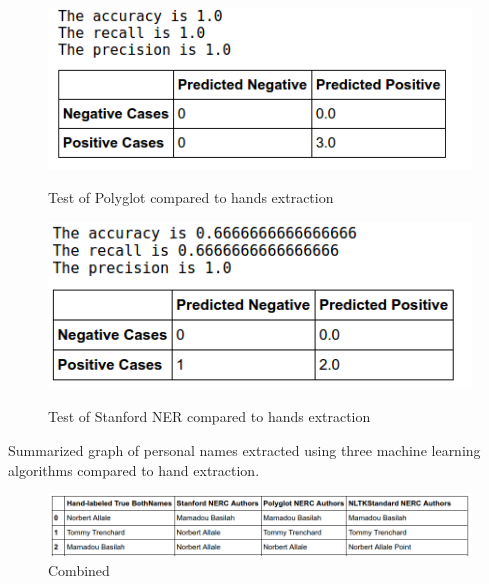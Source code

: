 \begin{figure}[hbtp]
\caption{Test of Polyglot compared to hands extraction}
\centering
\includegraphics[scale=1]{images/11.png}\label{prediction}
\end{figure}
\newpage 
\begin{figure}[hbtp]
\caption{Test of Stanford NER  compared to hands extraction}
\centering
\includegraphics[scale=1]{images/33.png}\label{prediction}
\end{figure} 

Summarized graph of personal names extracted using three machine learning algorithms compared to hand extraction.
\newpage
 
\begin{figure}[hbtp]
\caption{Combined}
\centering
\includegraphics[scale=.5]{images/6.png}
\end{figure}

